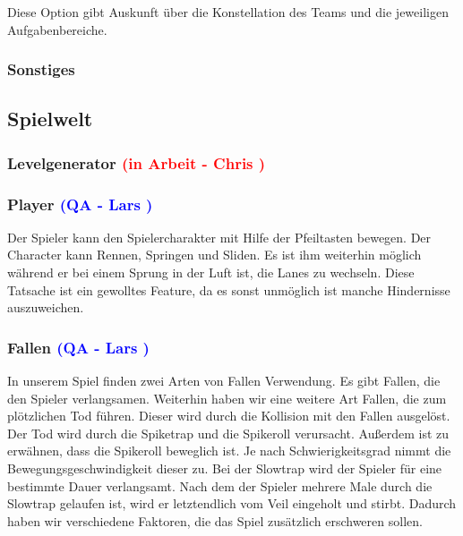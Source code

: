 \documentclass[12pt]{article}
\begin{document}
Diese Option gibt Auskunft über die Konstellation des Teams und die jeweiligen Aufgabenbereiche.

\vspace{1cm}
\subsubsection{Sonstiges}

\vspace{2cm}
\subsection{Spielwelt}

\vspace{1cm}
\subsubsection{Levelgenerator  \textcolor{red}{(in Arbeit - Chris )}}

\vspace{1cm}
\subsubsection{Player \textcolor{blue}{(QA - Lars )}}

Der Spieler kann den Spielercharakter mit Hilfe der Pfeiltasten bewegen. Der Character kann Rennen, Springen und Sliden. Es ist ihm weiterhin möglich
während er bei einem Sprung in der Luft ist, die Lanes zu wechseln. Diese Tatsache ist ein gewolltes Feature, da es sonst unmöglich ist manche Hindernisse
auszuweichen.

\vspace{1cm}
\subsubsection{Fallen \textcolor{blue}{(QA - Lars )}}

In unserem Spiel finden zwei Arten von Fallen Verwendung. Es gibt Fallen, die den Spieler verlangsamen. Weiterhin haben wir eine
weitere Art Fallen, die zum plötzlichen Tod führen. Dieser wird durch die Kollision mit den Fallen ausgelöst. Der Tod wird durch die
Spiketrap und die Spikeroll verursacht. Außerdem ist zu erwähnen, dass die Spikeroll beweglich ist. Je nach Schwierigkeitsgrad nimmt
die Bewegungsgeschwindigkeit dieser zu. Bei der Slowtrap wird der Spieler für eine bestimmte Dauer verlangsamt. Nach dem der Spieler
mehrere Male durch die Slowtrap gelaufen ist, wird er letztendlich vom Veil eingeholt und stirbt. Dadurch haben wir verschiedene Faktoren,
die das Spiel zusätzlich erschweren sollen.
\end{document}
